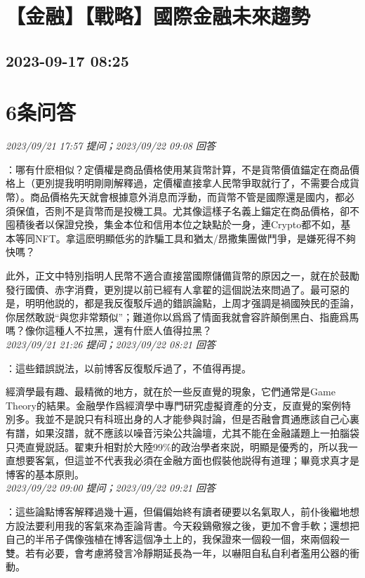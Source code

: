 \documentclass[twocolumn]{ctexart}
\begin{document}
\section{【金融】【戰略】國際金融未來趨勢}
\subsection{2023-09-17 08:25}


\section{6条问答}

\textit{\hfill\noindent\small 2023/09/21 17:57 提问；2023/09/22 09:08 回答}

：哪有什麽相似？定價權是商品價格使用某貨幣計算，不是貨幣價值錨定在商品價格上（更別提我明明剛剛解釋過，定價權直接拿人民幣爭取就行了，不需要合成貨幣）。商品價格先天就會根據意外消息而浮動，而貨幣不管是國際還是國内，都必須保值，否則不是貨幣而是投機工具。尤其像這樣子名義上錨定在商品價格，卻不囤積後者以保證兌換，集金本位和信用本位之缺點於一身，連Crypto都不如，基本等同NFT。拿這麽明顯低劣的詐騙工具和猶太/昂撒集團做鬥爭，是嫌死得不夠快嗎？

此外，正文中特別指明人民幣不適合直接當國際儲備貨幣的原因之一，就在於鼓勵發行國債、赤字消費，更別提以前已經有人拿翟的這個説法來問過了。最可惡的是，明明他説的，都是我反復駁斥過的錯誤論點，上周才强調是禍國殃民的歪論，你居然敢説“與您非常類似”；難道你以爲爲了情面我就會容許顛倒黑白、指鹿爲馬嗎？像你這種人不拉黑，還有什麽人值得拉黑？
\\

\textit{\hfill\noindent\small 2023/09/21 21:26 提问；2023/09/22 08:21 回答}

：這些錯誤説法，以前博客反復駁斥過了，不值得再提。

經濟學最有趣、最精微的地方，就在於一些反直覺的現象，它們通常是Game Theory的結果。金融學作爲經濟學中專門研究虛擬資產的分支，反直覺的案例特別多。我並不是說只有科班出身的人才能參與討論，但是否融會貫通應該自己心裏有譜，如果沒譜，就不應該以噪音污染公共論壇，尤其不能在金融議題上一拍腦袋只凴直覺説話。翟東升相對於大陸99\%的政治學者來説，明顯是優秀的，所以我一直想要客氣，但這並不代表我必須在金融方面也假裝他説得有道理；畢竟求真才是博客的基本原則。
\\

\textit{\hfill\noindent\small 2023/09/22 09:00 提问；2023/09/22 09:21 回答}

：這些論點博客解釋過幾十遍，但偏偏始終有讀者硬要以名氣取人，前仆後繼地想方設法要利用我的客氣來為歪論背書。今天殺鷄儆猴之後，更加不會手軟；還想把自己的半吊子偶像強植在博客這個净土上的，我保證來一個殺一個，來兩個殺一雙。若有必要，會考慮將發言冷靜期延長為一年，以嚇阻自私自利者濫用公器的衝動。
\\
\end{document}
